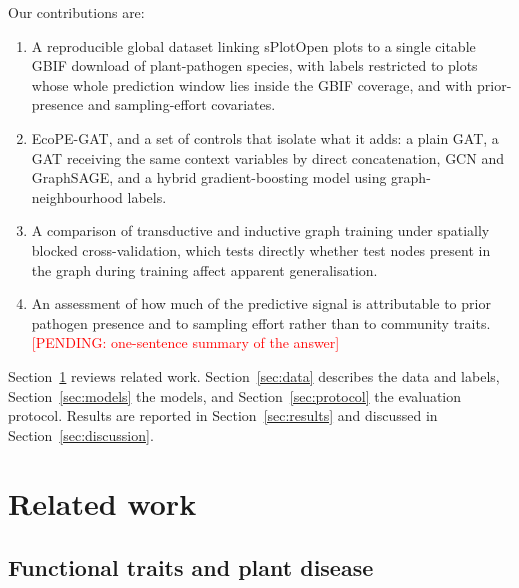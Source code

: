 \documentclass[a4paper,fleqn]{cas-sc}
\newcommand{\pending}[1]{\textcolor{red}{[PENDING: #1]}}
\begin{document}
Our contributions are:
\begin{enumerate}[leftmargin=1.4em]
  \item A reproducible global dataset linking \nEligible{} sPlotOpen plots to a single citable GBIF download of \gbifSpecies{} plant-pathogen species, with labels restricted to plots whose whole prediction window lies inside the GBIF coverage, and with prior-presence and sampling-effort covariates.
  \item EcoPE-GAT, and a set of controls that isolate what it adds: a plain GAT, a GAT receiving the same context variables by direct concatenation, GCN and GraphSAGE, and a hybrid gradient-boosting model using graph-neighbourhood labels.
  \item A comparison of transductive and inductive graph training under spatially blocked cross-validation, which tests directly whether test nodes present in the graph during training affect apparent generalisation.
  \item An assessment of how much of the predictive signal is attributable to prior pathogen presence and to sampling effort rather than to community traits. \pending{one-sentence summary of the answer}
\end{enumerate}

Section~\ref{sec:relwork} reviews related work. Section~\ref{sec:data} describes the data and labels, Section~\ref{sec:models} the models, and Section~\ref{sec:protocol} the evaluation protocol. Results are reported in Section~\ref{sec:results} and discussed in Section~\ref{sec:discussion}.

\section{Related work}
\label{sec:relwork}

\subsection{Functional traits and plant disease}
\end{document}
